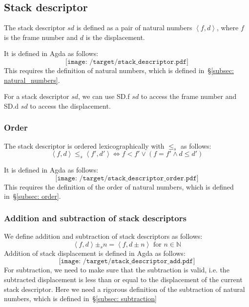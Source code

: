 \documentclass[12pt,twoside,a4paper]{report}
\theoremstyle{definition}
\theoremstyle{definition}
\theoremstyle{definition}
\theoremstyle{definition}
\newcommand{\secref}[1]{\S\ref{#1}}
\newcommand{\dpink}[1]{\textcolor{darkpink}{#1}}
\newcommand{\ang}[1]{\left\langle #1 \right\rangle}
\begin{document}
    \subsection{Stack descriptor}
    The stack descriptor $sd$ is defined as a pair of natural numbers $\ang{f, d}$, where $f$ is the frame number and $d$ is the displacement. 

    It is defined in Agda as follows:
    \[\texttt{[image: /target/stack\_descriptor.pdf]}\]
    This requires the definition of natural numbers, which is defined in~\secref{subsec: natural_numbers}.

    For a stack descriptor $sd$, we can use \dpink{SD.f} $sd$ to access the frame number and \dpink{SD.d} $sd$ to access the displacement. 

    \subsubsection{Order}
    The stack descriptor is ordered lexicographically with $\leq_s$ as follows:
    \[\ang{f, d} \leq_s \ang{f', d'} \Leftrightarrow f < f' \lor (f = f' \land d \leq d')\]

    It is defined in Agda as follows:
    \[\texttt{[image: /target/stack\_descriptor\_order.pdf]}\]
    This requires the definition of the order of natural numbers, which is defined in~\secref{subsec: order}.

    \subsubsection{Addition and subtraction of stack descriptors}
    We define addition and subtraction of stack descriptors as follows:
    \[\ang{f, d} \pm_s n = \ang{f, d \pm n} \text{ for } n \in \mathbb{N}\]
    Addition of stack displacement is defined in Agda as follows:
    \[\texttt{[image: /target/stack\_descriptor\_add.pdf]}\]
    For subtraction, we need to make sure that the subtraction is valid, i.e. the subtracted displacement is less than or equal to the displacement of the current stack descriptor. Here we need a rigorous definition of the subtraction of natural numbers, which is defined in~\secref{subsec: subtraction}
\end{document}
